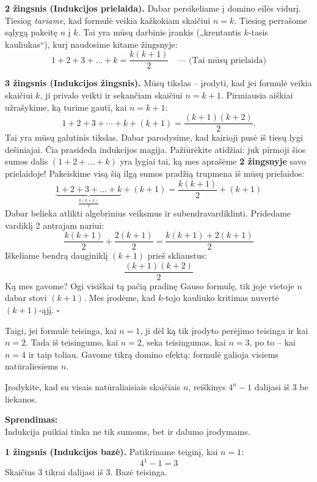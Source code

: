 \documentclass[11pt,a4paper]{scrartcl}
\begin{document}
\textbf{2 žingsnis (Indukcijos prielaida).} Dabar persikeliame į domino eilės vidurį. Tiesiog \textit{tariame}, kad formulė veikia kažkokiam skaičiui $n = k$. Tiesiog perrašome sąlygą pakeitę $n$ į $k$. Tai yra mūsų darbinis įrankis („krentantis $k$-tasis kauliukas“), kurį naudosime kitame žingsnyje:
$$
1 + 2 + 3 + \dots + k = \frac{k(k+1)}{2} \quad \text{--- (Tai mūsų prielaida)}
$$

\textbf{3 žingsnis (Indukcijos žingsnis).} Mūsų tikslas – įrodyti, kad jei formulė veikia skaičiui $k$, ji privalo veikti ir sekančiam skaičiui $n = k+1$. 
Pirmiausia aiškiai užrašykime, ką turime gauti, kai $n=k+1$:
\begin{equation}
1+2+3+\cdots+k+(k+1) = \frac{(k+1)(k+2)}{2}.
\end{equation}
Tai yra mūsų galutinis tikslas. Dabar parodysime, kad kairioji pusė iš tiesų lygi dešiniajai.
Čia prasideda indukcijos magija. Pažiūrėkite atidžiai: juk pirmoji šios sumos dalis $(1 + 2 + \dots + k)$ yra lygiai tai, ką mes aprašėme \textbf{2 žingsnyje} savo prielaidoje! 
Pakeiskime visą šią ilgą sumos pradžią trupmena iš mūsų prielaidos:
$$
\underbrace{1 + 2 + 3 + \dots + k}_{\frac{k(k+1)}{2}} + (k+1) = \frac{k(k+1)}{2} + (k+1)
$$
Dabar belieka atlikti algebrinius veiksmus ir subendravardiklinti. Pridedame vardiklį 2 antrajam nariui:
$$
\frac{k(k+1)}{2} + \frac{2(k+1)}{2} = \frac{k(k+1) + 2(k+1)}{2}
$$
Iškeliame bendrą dauginiklį $(k+1)$ prieš skliaustus:
$$
\frac{(k+1)(k+2)}{2}
$$
Ką mes gavome? Ogi visiškai tą pačią pradinę Gauso formulę, tik joje vietoje $n$ dabar stovi $(k+1)$. Mes įrodėme, kad $k$-tojo kauliuko kritimas nuvertė $(k+1)$-ąjį. \hfill $\square$

Taigi, jei formulė teisinga, kai $n=1$, ji dėl ką tik įrodyto perėjimo teisinga ir kai $n=2$. Tada iš teisingumo, kai $n=2$, seka teisingumas, kai $n=3$, po to – kai $n=4$ ir taip toliau. Gavome tikrą domino efektą: formulė galioja visiems natūraliesiems $n$.


\begin{example}[Dalumas]
Įrodykite, kad su visais natūraliaisiais skaičiais $n$, reiškinys $4^n - 1$ dalijasi iš $3$ be liekanos.
\end{example}

\textbf{Sprendimas:}\\
Indukcija puikiai tinka ne tik sumoms, bet ir dalumo įrodymams. 

\textbf{1 žingsnis (Indukcijos bazė).} Patikriname teiginį, kai $n = 1$:
$$
4^1 - 1 = 3
$$
Skaičius 3 tikrai dalijasi iš 3. Bazė teisinga.
\end{document}
